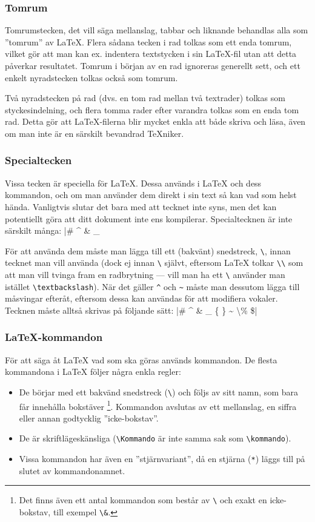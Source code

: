 \documentclass[swe,12pt]{skrapport}
\makeatletter
\let\@oldLaTeX\LaTeX
\def\LaTeX{\texorpdfstring{\@oldLaTeX}{LaTeX}}
\newcommand\cmd[1]{\texttt{\textbackslash{}#1}}			%
\makeatother
\begin{document}
	\subsubsection{Tomrum}
	Tomrumstecken, det vill säga mellanslag, tabbar och liknande behandlas
	alla som ''tomrum'' av \LaTeX{}. Flera sådana tecken i rad tolkas som ett
	enda tomrum, vilket gör att man kan ex. indentera textstycken i sin
	\LaTeX-fil utan att detta påverkar resultatet. Tomrum i början av en rad
	ignoreras generellt sett, och ett enkelt nyradstecken tolkas också som
	tomrum.
	
	Två nyradstecken på rad (dvs. en tom rad mellan två textrader) tolkas som
	styckesindelning, och flera tomma rader efter varandra tolkas som en enda
	tom rad. Detta gör att \LaTeX{}-filerna blir mycket enkla att både skriva
	och läsa, även om man inte är en särskilt bevandrad \TeX{}niker.
	
	\subsubsection{Specialtecken}
	Vissa tecken är speciella för \LaTeX{}. Dessa används i \LaTeX{} och dess
	kommandon, och om man använder dem direkt i sin text så kan vad som helst
	hända. Vanligtvis slutar det bara med att tecknet inte syns, men det kan
	potentiellt göra att ditt dokument inte ens kompilerar. Specialtecknen
	är inte särskilt många:
	|# ^ & _ { } ~ \ %
	
	För att använda dem måste man lägga till ett (bakvänt) snedstreck,
	\cmd{}, innan tecknet man vill använda (dock ej innan
	\cmd{} självt, eftersom \LaTeX{} tolkar
	\cmd{\textbackslash} som att man vill tvinga fram en
	radbrytning --- vill man ha ett \cmd{} använder man istället
	\cmd{textbackslash}).
	När det gäller \texttt{\^{}} och \texttt{\~{}} måste man
	dessutom lägga till måsvingar efteråt, eftersom dessa kan användas för att
	modifiera vokaler. Tecknen måste alltså skrivas på följande sätt:
	|\# \^{} \& \_ \{ \} \~{} \textbackslash \% \$|
	
	\subsubsection{\LaTeX-kommandon}
	För att säga åt \LaTeX{} vad som ska göras används kommandon. De flesta
	kommandona i \LaTeX{} följer några enkla regler:
	\begin{itemize}
		\item De börjar med ett bakvänd snedstreck (\cmd{}) och följs av sitt
		namn, som bara får innehålla bokstäver%
		\footnote{Det finns även ett antal kommandon som består av \cmd{} och
		exakt en icke-bokstav, till exempel \cmd{\&}.}.
		Kommandon avslutas av ett
		mellanslag, en siffra eller annan godtycklig ''icke-bokstav''.
		
		\item De är skriftlägeskänsliga (\cmd{Kommando} är inte samma sak som
		\cmd{kommando}).
		
		\item Vissa kommandon har även en ''stjärnvariant'', då en stjärna
		(\texttt{*}) läggs till på slutet av kommandonamnet.
	\end{itemize}
	
\end{document}
